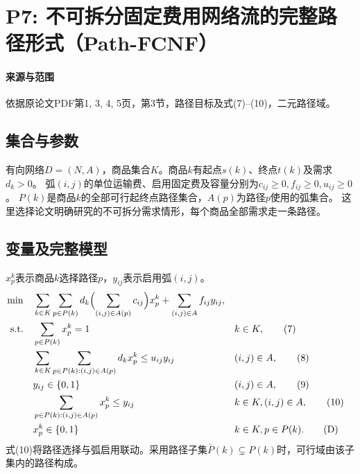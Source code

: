 \documentclass[UTF8,11pt]{ctexart}
\begin{document}
\section*{P7: 不可拆分固定费用网络流的完整路径形式（Path-FCNF）}
\paragraph{来源与范围}依据原论文PDF第1, 3, 4, 5页，第3节，路径目标及式(7)–(10)，二元路径域。

\subsection*{集合与参数}
有向网络$D=(N,A)$，商品集合$K$。商品$k$有起点$s(k)$、终点$t(k)$及需求$d_k>0$。
弧$(i,j)$的单位运输费、启用固定费及容量分别为$c_{ij}\ge0,f_{ij}\ge0,u_{ij}\ge0$。
$P(k)$是商品$k$的全部可行起终点路径集合，$A(p)$为路径$p$使用的弧集合。
这里选择论文明确研究的不可拆分需求情形，每个商品全部需求走一条路径。
\subsection*{变量及完整模型}
$x_p^k$表示商品$k$选择路径$p$，$y_{ij}$表示启用弧$(i,j)$。
\begin{align}
\min\quad &\sum_{k\in K}\sum_{p\in P(k)}d_k\Bigl(\sum_{(i,j)\in A(p)}c_{ij}\Bigr)x_p^k+\sum_{(i,j)\in A}f_{ij}y_{ij},\label{obj}\\
\text{s.t.}\quad &\sum_{p\in P(k)}x_p^k=1 &&k\in K,\tag{7}\\
&\sum_{k\in K}\sum_{p\in P(k):(i,j)\in A(p)}d_kx_p^k\le u_{ij}y_{ij} &&(i,j)\in A,\tag{8}\\
&y_{ij}\in\{0,1\} &&(i,j)\in A,\tag{9}\\
&\sum_{p\in P(k):(i,j)\in A(p)}x_p^k\le y_{ij} &&k\in K,(i,j)\in A,\tag{10}\\
&x_p^k\in\{0,1\} &&k\in K,p\in P(k).\tag{D}
\end{align}
式(10)将路径选择与弧启用联动。采用路径子集$\bar P(k)\subsetneq P(k)$时，可行域由该子集内的路径构成。
\end{document}
